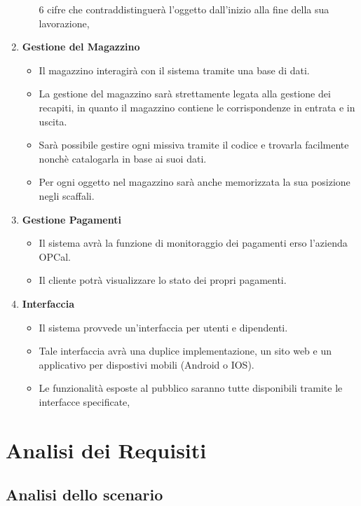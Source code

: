 \documentclass[a4paper,12pt]{article}
\begin{document}
\begin{enumerate}
\begin{itemize}
            6 cifre che contraddistinguerà l'oggetto dall'inizio alla fine della sua lavorazione,
	      \end{itemize}
	\item \textbf{Gestione del Magazzino} \begin{itemize}
		      \item Il magazzino interagirà con il sistema tramite una base di dati.
		      \item La gestione del magazzino sarà strettamente legata alla gestione dei recapiti, in quanto il magazzino contiene 
            le corrispondenze in entrata e in uscita.
		      \item Sarà possibile gestire ogni missiva tramite il codice e trovarla facilmente nonchè catalogarla in base ai suoi dati.
		      \item Per ogni oggetto nel magazzino sarà anche memorizzata la sua posizione negli scaffali.
	      \end{itemize}
	\item \textbf{Gestione Pagamenti} \begin{itemize}
		      \item Il sistema avrà la funzione di monitoraggio dei pagamenti erso l'azienda OPCal.
		      \item Il cliente potrà visualizzare lo stato dei propri pagamenti.
	      \end{itemize}
	\item \textbf{Interfaccia} \begin{itemize}
		      \item Il sistema provvede un'interfaccia per utenti e dipendenti.
		      \item Tale interfaccia avrà una duplice implementazione, un sito web e un applicativo per dispostivi mobili (Android o IOS).
		      \item Le funzionalità esposte al pubblico saranno tutte disponibili tramite le interfacce specificate,
	      \end{itemize}
\end{enumerate}

\newpage
\section{Analisi dei Requisiti}
\subsection{Analisi dello scenario}
\end{document}
